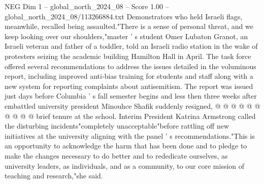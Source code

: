 \begin{textsample}{NEG Dim 1 – global\_north\_2024\_08 – Score 1.00 – global\_north\_2024\_08/113266884.txt}
Demonstrators who held Israeli flags, meanwhile, recalled being assaulted."There is a sense of personal threat, and we keep looking over our shoulders,"master ' s student Omer Lubaton Granot, an Israeli veteran and father of a toddler, told an Israeli radio station in the wake of protesters seizing the academic building Hamilton Hall in April.
The task force offered several recommendations to address the issues detailed in the voluminous report, including improved anti-bias training for students and staff along with a new system for reporting complaints about antisemitism.
The report was issued just days before Columbia ' s fall semester begins and less then three weeks after embattled university president Minouhce Shafik suddenly resigned, @ @ @ @ @ @ @ @ @ @ brief tenure at the school.
Interim President Katrina Armstrong called the disturbing incidents"completely unacceptable"before rattling off new initiatives at the university aligning with the panel ' s recommendations."This is an opportunity to acknowledge the harm that has been done and to pledge to make the changes necessary to do better and to rededicate ourselves, as university leaders, as individuals, and as a community, to our core mission of teaching and research,"she said.

\end{textsample}
